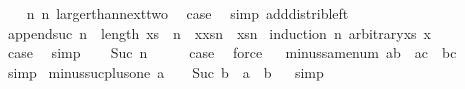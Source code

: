 \begin{isabellebody}
\ \ \isamarkupfalse%
\ n{}\ n{}\ larger{\isacharunderscore}than{\isacharunderscore}next{\isacharunderscore}two\ \isamarkupfalse%
\ {\isacharquery}case\ \isamarkupfalse%
\ {\isacharparenleft}simp\ add{\isacharcolon}distrib{\isacharunderscore}left{\isacharparenright}\isanewline
{}\isamarkupfalse%
%
\endisatagproof
{\isafoldproof}%
%
\isadelimproof
\isanewline
%
\endisadelimproof
\isanewline
{}\isamarkupfalse%
\ append{\isacharunderscore}suc{\isacharcolon}\ {\isachardoublequoteopen}n{\isasymge}{}\ {\isasymLongrightarrow}\ length\ xs\ {\isasymge}\ n\ {\isasymLongrightarrow}\ {\isacharparenleft}x{\isacharhash}xs{\isacharparenright}{\isacharbang}n\ {\isacharequal}\ xs{\isacharbang}{\isacharparenleft}n{\isacharminus}{}{\isacharparenright}{\isachardoublequoteclose}\isanewline
%
\isadelimproof
%
\endisadelimproof
%
\isatagproof
{}\isamarkupfalse%
\ {\isacharparenleft}induction\ n\ arbitrary{\isacharcolon}xs\ x{\isacharparenright}\isanewline
{}\isamarkupfalse%
\ {}\isanewline
\ \ \isamarkupfalse%
\ \isamarkupfalse%
\ {\isacharquery}case\ \isamarkupfalse%
\ simp\isanewline
{}\isamarkupfalse%
\isanewline
\ \ \isamarkupfalse%
\ {\isacharparenleft}Suc\ n{\isacharparenright}\isanewline
\ \ \isamarkupfalse%
\ \isamarkupfalse%
\ {\isacharquery}case\ \isamarkupfalse%
\ force\isanewline
{}\isamarkupfalse%
%
\endisatagproof
{\isafoldproof}%
%
\isadelimproof
\ \isanewline
%
\endisadelimproof
\isanewline
{}\isamarkupfalse%
\ minus{\isacharunderscore}same{\isacharunderscore}num{\isacharcolon}\ {\isachardoublequoteopen}a{\isacharequal}b\ {\isasymLongrightarrow}\ a{\isacharminus}c\ {\isacharequal}\ b{\isacharminus}c{\isachardoublequoteclose}%
\isadelimproof
\ %
\endisadelimproof
%
\isatagproof
{}\isamarkupfalse%
\ simp%
\endisatagproof
{\isafoldproof}%
%
\isadelimproof
%
\endisadelimproof
\isanewline
\isanewline
{}\isamarkupfalse%
\ minus{\isacharunderscore}suc{\isacharunderscore}plus{\isacharunderscore}one{\isacharcolon}\ {\isachardoublequoteopen}a\ {\isacharplus}\ {}\ {\isacharminus}\ {\isacharparenleft}Suc\ b{\isacharparenright}\ {\isacharequal}\ a\ {\isacharminus}\ b{\isachardoublequoteclose}%
\isadelimproof
\ %
\endisadelimproof
%
\isatagproof
{}\isamarkupfalse%
\ simp%
\endisatagproof
{\isafoldproof}%

\end{isabellebody}
